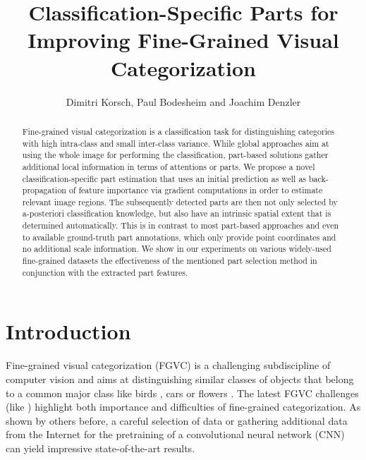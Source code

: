 \documentclass[runningheads]{llncs}
\begin{document}
	\pagestyle{headings}
	\mainmatter

	\title{Classification-Specific Parts for Improving Fine-Grained Visual Categorization}

	\author{
		Dimitri Korsch,
		Paul Bodesheim and
		Joachim Denzler
	}

	\maketitle
	\vspace{-.1cm}
	\begin{abstract}
Fine-grained visual categorization is a classification task for distinguishing categories with high intra-class and small inter-class variance.
While global approaches aim at using the whole image for performing the classification, part-based solutions gather additional local information in terms of attentions or parts.
We propose a novel classification-specific part estimation that uses an initial prediction as well as back-propagation of feature importance via gradient computations in order to estimate relevant image regions.
The subsequently detected parts are then not only selected by a-posteriori classification knowledge, but also have an intrinsic spatial extent that is determined automatically.
This is in contrast to most part-based approaches and even to available ground-truth part annotations, which only provide point coordinates and no additional scale information.
We show in our experiments on various widely-used fine-grained datasets the effectiveness of the mentioned part selection method in conjunction with the extracted part features.
\end{abstract}
 	\section{Introduction}
\label{sec:introduction}

Fine-grained visual categorization (FGVC) is a challenging subdiscipline of computer vision and aims at distinguishing similar classes of objects that belong to a common major class like birds \cite{NABirds,CUB_200_2011}, cars \cite{StanfordCars} or flowers \cite{Flowers102}.
The latest FGVC challenges (like \cite{iNaturalist}) highlight both importance and difficulties of fine-grained categorization.
As shown by others before, a careful selection of data \cite{Cui_2018_CVPR_large} or gathering additional data from the Internet \cite{krause2016unreasonable} for the pretraining of a convolutional neural network (CNN) can yield impressive state-of-the-art results.
\end{document}
